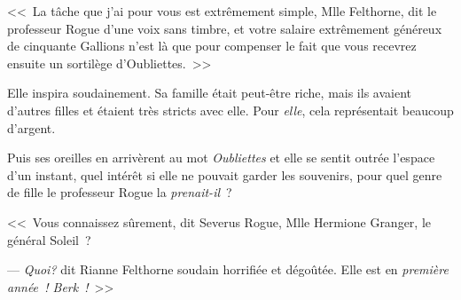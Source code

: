 <<~La tâche que j'ai pour vous est extrêmement simple, Mlle Felthorne, dit le professeur Rogue d'une voix sans timbre, et votre salaire extrêmement généreux de cinquante Gallions n'est là que pour compenser le fait que vous recevrez ensuite un sortilège d'Oubliettes.~>>

Elle inspira soudainement. Sa famille était peut-être riche, mais ils avaient d'autres filles et étaient très stricts avec elle. Pour \emph{elle}, cela représentait beaucoup d'argent.

Puis ses oreilles en arrivèrent au mot \emph{Oubliettes} et elle se sentit outrée l'espace d'un instant, quel intérêt si elle ne pouvait garder les souvenirs, pour quel genre de fille le professeur Rogue la \emph{prenait-il}~?

<<~Vous connaissez sûrement, dit Severus Rogue, Mlle Hermione Granger, le général Soleil~?

--- \emph{Quoi?} dit Rianne Felthorne soudain horrifiée et dégoûtée. Elle est en \emph{première année~! Berk~!}~>>
